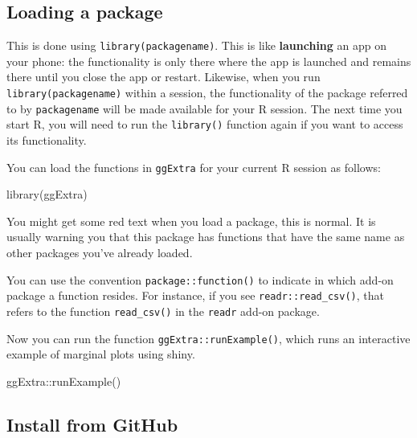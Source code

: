 \documentclass[
  oneside]{book}
\newenvironment{Shaded}{\begin{snugshade}}{\end{snugshade}}
\newcommand{\FunctionTok}[1]{\textcolor[rgb]{0.00,0.00,0.00}{#1}}
\newcommand{\NormalTok}[1]{#1}
\newcommand{\SpecialCharTok}[1]{\textcolor[rgb]{0.00,0.00,0.00}{#1}}
\begin{document}
\hypertarget{loading-a-package}{%
\subsection{Loading a package}\label{loading-a-package}}

This is done using \texttt{library(packagename)}. This is like \textbf{launching} an app on your phone: the functionality is only there where the app is launched and remains there until you close the app or restart. Likewise, when you run \texttt{library(packagename)} within a session, the functionality of the package referred to by \texttt{packagename} will be made available for your R session. The next time you start R, you will need to run the \texttt{library()} function again if you want to access its functionality.

You can load the functions in \texttt{ggExtra} for your current R session as follows:

\begin{Shaded}
\begin{Highlighting}[]
\FunctionTok{library}\NormalTok{(ggExtra)}
\end{Highlighting}
\end{Shaded}

You might get some red text when you load a package, this is normal. It is usually warning you that this package has functions that have the same name as other packages you've already loaded.

\begin{info}
You can use the convention \texttt{package::function()} to indicate in which add-on package a function resides. For instance, if you see \texttt{readr::read\_csv()}, that refers to the function \texttt{read\_csv()} in the \texttt{readr} add-on package.

\end{info}

Now you can run the function \texttt{ggExtra::runExample()}, which runs an interactive example of marginal plots using shiny.

\begin{Shaded}
\begin{Highlighting}[]
\NormalTok{ggExtra}\SpecialCharTok{::}\FunctionTok{runExample}\NormalTok{()}
\end{Highlighting}
\end{Shaded}

\hypertarget{install-from-github}{%
\subsection{Install from GitHub}\label{install-from-github}}
\end{document}
